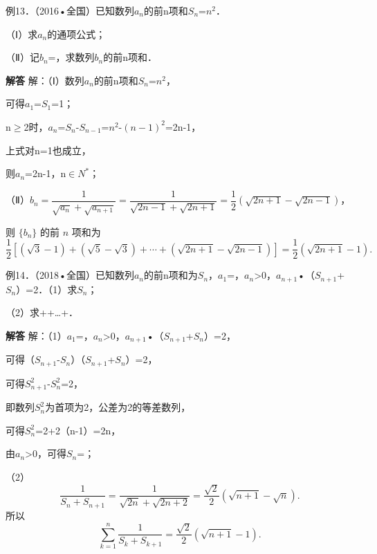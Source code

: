 例13．（2016•全国）已知数列{\ensuremath{a_{n}}}的前n项和\ensuremath{S_{n}}=\ensuremath{n^{2}}．\par
（Ⅰ）求{\ensuremath{a_{n}}}的通项公式；\par
（Ⅱ）记\ensuremath{b_{n}}=，求数列{\ensuremath{b_{n}}}的前n项和．\par
\QuestionSpace{4.8cm}
\ifshowanswers
\par\begingroup\color{solutioncolor}\noindent\textbf{解答}\quad
解：（Ⅰ）数列{\ensuremath{a_{n}}}的前n项和\ensuremath{S_{n}}=\ensuremath{n^{2}}，\par
可得\ensuremath{a_{1}}=\ensuremath{S_{1}}=1；\par
n\ensuremath{\ge}2时，\ensuremath{a_{n}}=\ensuremath{S_{n}}-\ensuremath{S_{n-1}}=\ensuremath{n^{2}}-\ensuremath{(n-1)^{2}}=2n-1，\par
上式对n=1也成立，\par
则\ensuremath{a_{n}}=2n-1，n\ensuremath{\in}\ensuremath{N^*}；\par
（Ⅱ）$b_n=\dfrac1{\sqrt{a_n}+\sqrt{a_{n+1}}}=\dfrac1{\sqrt{2n-1}+\sqrt{2n+1}}=\dfrac12\left(\sqrt{2n+1}-\sqrt{2n-1}\right)$，\par
则 $\{b_n\}$ 的前 $n$ 项和为\[\frac12\left[(\sqrt3-1)+(\sqrt5-\sqrt3)+\cdots+(\sqrt{2n+1}-\sqrt{2n-1})\right]=\frac12\left(\sqrt{2n+1}-1\right).\]\par
\par\endgroup\fi

例14．（2018•全国）已知数列{\ensuremath{a_{n}}}的前n项和为\ensuremath{S_{n}}，\ensuremath{a_{1}}=，\ensuremath{a_{n}}>0，\ensuremath{a_{n+1}}•（\ensuremath{S_{n+1}}+\ensuremath{S_{n}}）=2．（1）求\ensuremath{S_{n}}；\par
（2）求++\ldots{}+．\par
\QuestionSpace{3.5cm}
\ifshowanswers
\par\begingroup\color{solutioncolor}\noindent\textbf{解答}\quad
解：（1）\ensuremath{a_{1}}=，\ensuremath{a_{n}}>0，\ensuremath{a_{n+1}}•（\ensuremath{S_{n+1}}+\ensuremath{S_{n}}）=2，\par
可得（\ensuremath{S_{n+1}}-\ensuremath{S_{n}}）（\ensuremath{S_{n+1}}+\ensuremath{S_{n}}）=2，\par
可得\ensuremath{S_{n+1}^{2}}-\ensuremath{S_{n}^{2}}=2，\par
即数列{\ensuremath{S_{n}^{2}}}为首项为2，公差为2的等差数列，\par
可得\ensuremath{S_{n}^{2}}=2+2（n-1）=2n，\par
由\ensuremath{a_{n}}>0，可得\ensuremath{S_{n}}=；\par
（2）
\[
\frac1{S_n+S_{n+1}}
=\frac1{\sqrt{2n}+\sqrt{2n+2}}
=\frac{\sqrt2}{2}\left(\sqrt{n+1}-\sqrt n\right).
\]
所以
\[
\sum_{k=1}^{n}\frac1{S_k+S_{k+1}}
=\boxed{\frac{\sqrt2}{2}\left(\sqrt{n+1}-1\right)}.
\]
\par\endgroup\fi

